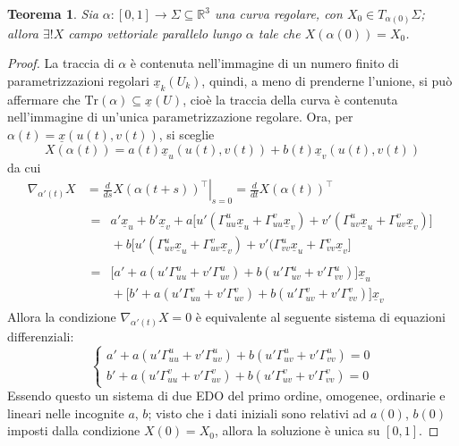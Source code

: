 \documentclass[12pt]{scrartcl}
\theoremstyle{style}
\newtheorem{teorema}{Teorema}[section]
\newcommand*\Eval[3]{\left.#1\right\rvert_{#2}^{#3}}
\numberwithin{equation}{subsection}
\begin{document}
\begin{teorema}
	Sia $\alpha : [0,1] \to \Sigma \subseteq \mathbb{R}^3$ una curva regolare, con $X_0 \in T_{\alpha (0)} \Sigma$; allora $\exists ! X$ campo vettoriale parallelo lungo $\alpha $ tale che $X(\alpha (0)) = X_0$.
\end{teorema}
\begin{proof}
	La traccia di $\alpha $ \`e contenuta nell'immagine di un numero finito di parametrizzazioni regolari $\underline{x}_k(U_k)$, quindi, a meno di prenderne l'unione, si pu\`o affermare che $\mathrm{Tr} (\alpha ) \subseteq \underline{x}(U)$, cio\`e la traccia della curva \`e contenuta nell'immagine di un'unica parametrizzazione regolare.
	Ora, per $\alpha  (t) = \underline{x}(u(t),v(t))$, si sceglie
	\[
	X(\alpha (t)) = a(t) \underline{x}_u (u(t) ,v(t)) + b(t) \underline{x}_v (u(t),v(t))
	\] 
	da cui
	\[
	\begin{split}
		\displaystyle \nabla _{\alpha '(t)} X &=\Eval{\frac{d }{d s}X(\alpha (t+s))^\top}{s=0}{}  = \frac{d }{d t} X(\alpha (t))^\top\\
						      &\begin{split}
							      \text{}=\text{}&a' \underline{x}_u + b ' \underline{x}_v +a \big[u'(\Gamma_{uu} ^{u} \underline{x}_u + \Gamma_{uu} ^v \underline{x}_v) + v ' (\Gamma^u_{uv} \underline{x}_u + \Gamma_{uv} ^v \underline{x}_v)\big]\\
								      &\text{}+ b \big[u'(\Gamma_{uv} ^u \underline{x}_u + \Gamma_{uv} ^v \underline{x}_v) + v' (\Gamma_{vv} ^u \underline{x}_u + \Gamma_{vv} ^v\underline{x}_v\big]
						      \end{split}\\
						      &\begin{split}
							      \text{}=\text{}&\big[a' + a(u' \Gamma_{uu} ^u + v' \Gamma_{uv} ^u) + b(u'\Gamma_{uv} ^u + v'\Gamma_{vv} ^u)\big]\underline{x}_u\\
								      &\text{}+ \big[b' + a(u'\Gamma_{uu} ^v + v' \Gamma_{uv} ^v) + b (u' \Gamma_{uv} ^v + v' \Gamma_{vv} ^v)\big]\underline{x}_v
						      \end{split}
	\end{split}
	\] 
Allora la condizione $\nabla _{\alpha '(t)}X=0$ \`e equivalente al seguente sistema di equazioni differenziali:
\begin{equation}\label{sisdif}
	\begin{cases}
		a' + a(u' \Gamma_{uu} ^u + v' \Gamma_{uv} ^u) + b(u'\Gamma_{uv} ^u + v'\Gamma_{vv} ^u)=0\\
		b' + a(u'\Gamma_{uu} ^v + v' \Gamma_{uv} ^v) + b (u' \Gamma_{uv} ^v + v' \Gamma_{vv} ^v)=0
	\end{cases}
\end{equation}
Essendo questo un sistema di due EDO del primo ordine, omogenee, ordinarie e lineari nelle incognite $a$, $b$; visto che i dati iniziali sono relativi ad $a(0)$, $b(0)$ imposti dalla condizione $X(0) = X_0$, allora la soluzione \`e unica su $[0,1]$.
\end{proof}
\end{document}
